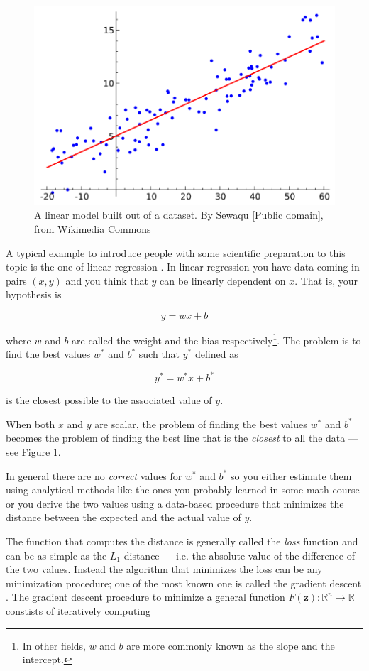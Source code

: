 \begin{figure}
  \centering
  \includegraphics[width=0.5\linewidth]{Images/wikipedia-linear-regression.png}
  \caption{A linear model built out of a dataset. By Sewaqu [Public
      domain], from Wikimedia Commons}
  \label{fig:wikipedia-linear-regression}
\end{figure}

A typical example to introduce people with some scientific preparation
to this topic is the one of linear regression \cite{B071JXYDDB}. In
linear regression you have data coming in pairs $(x, y)$ and you think
that $y$ can be linearly dependent on $x$. That is, your hypothesis is

\begin{equation}
  y = w x + b
  \label{eq:linear-model}
\end{equation}

where $w$ and $b$ are called the weight and the bias
respectively\footnote{In other fields, $w$ and $b$ are more commonly
  known as the slope and the intercept.}. The problem is to find the
best values $w^*$ and $b^*$ such that $y^*$ defined as

\[ y^* = w^* x + b^* \]

is the closest possible to the associated value of $y$.

When both $x$ and $y$ are scalar, the problem of finding the best
values $w^*$ and $b^*$ becomes the problem of finding the best line
that is the \emph{closest} to all the data --- see Figure
\ref{fig:wikipedia-linear-regression}.

In general there are no \emph{correct} values for $w^*$ and
$b^*$ so you either estimate them using analytical methods like the ones
you probably learned in some math course or you derive the two values
using a data-based procedure that minimizes the
distance between the expected and the actual value of $y$.

The function that computes the distance is generally called the
\emph{loss} function and can be as simple as the $L_1$ distance
\cite{taxicab-geometry} --- i.e. the absolute value of the difference
of the two values. Instead the algorithm that minimizes the loss can be
any minimization procedure; one of the most known one is called the
gradient descent \cite{Goodfellow-et-al-2016}. The gradient descent
procedure to minimize a general function $F(\boldsymbol{z}):
\mathbb{R}^n \rightarrow \mathbb{R}$ constists of iteratively computing

